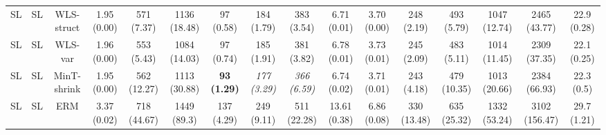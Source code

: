 \documentclass[preprint, 3p, times, twocolumn]{elsarticle}
\begin{document}
\begin{sidewaystable*}[t]
\begin{center}
{\begin{tabular}{l c cccccccccccccc}
  \hspace{0.1cm} 	SL	&SL	&WLS-struct	&1.95 (0.00)	&571 (7.37)	&1136 (18.48)	&97 (0.58)	&184 (1.79)	&383 (3.54)	&6.71 (0.01)	&3.70 (0.00)	&248 (2.19)	&493 (5.79)	&1047 (12.74)	&2465 (43.77)	&22.9 (0.28)	\\
  \hspace{0.1cm} 	SL	&SL	&WLS-var	&1.96 (0.00)	&553 (5.43)	&1084 (14.03)	&97 (0.74)	&185 (1.91)	&381 (3.82)	&6.78 (0.01)	&3.73 (0.01)	&245 (2.09)	&483 (5.11)	&1014 (11.45)	&2309 (37.35)	&22.1 (0.25)	\\
  \hspace{0.1cm} 	SL	&SL	&MinT-shrink	&1.95 (0.00)	&562 (12.27)	&1113 (30.88)	&\textbf{93 (1.29)}	&\textit{177 (3.29)}	&\textit{366 (6.59)}	&6.74 (0.02)	&3.71 (0.01)	&243 (4.18)	&479 (10.35)	&1013 (20.66)	&2384 (66.93)	&22.3 (0.5)	\\
  \hspace{0.1cm} 	SL	&SL	&ERM	&3.37 (0.02)	&718 (44.67)	&1449 (89.3)	&137 (4.29)	&249 (9.11)	&511 (22.28)	&13.61 (0.38)	&6.86 (0.08)	&330 (13.48)	&635 (25.32)	&1332 (53.24)	&3102 (156.47)	&29.7 (1.21)	\\
  
  
  
  \bottomrule
  \end{tabular}}
  \end{center}
  \end{sidewaystable*}
\end{document}
